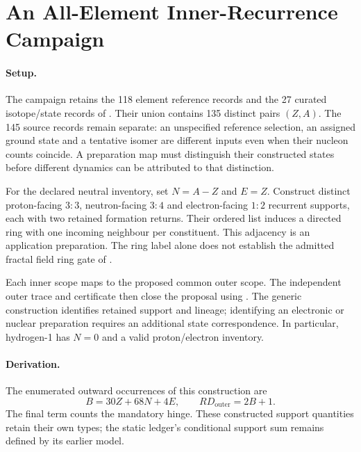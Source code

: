 \section{An All-Element Inner-Recurrence Campaign}
\label{manual2:all-element-campaign}


\paragraph{Setup.}
The campaign retains the 118 element reference records and the 27 curated
isotope/state records of . Their union contains
135 distinct pairs \((Z,A)\). The 145 source records remain separate: an
unspecified reference selection, an assigned ground state and a tentative isomer
are different inputs even when their nucleon counts coincide. A preparation map
must distinguish their constructed states before different dynamics can be
attributed to that distinction.

For the declared neutral inventory, set \(N=A-Z\) and \(E=Z\). Construct
distinct proton-facing \(3{:}3\), neutron-facing \(3{:}4\) and electron-facing
\(1{:}2\) recurrent supports, each with two retained formation returns.
Their ordered list induces a directed ring with one incoming neighbour per
constituent. This adjacency is an application preparation. The ring label alone
does not establish the admitted fractal field ring gate of
.

Each inner scope maps to the proposed common outer scope. The independent outer
trace and certificate then close the proposal using
. The generic construction identifies retained
support and lineage; identifying an electronic or nuclear preparation requires
an additional state correspondence. In particular, hydrogen-1 has \(N=0\)
and a valid proton/electron inventory.

\paragraph{Derivation.}
The enumerated outward occurrences of this construction are
\begin{equation}
B=30Z+68N+4E,
\qquad RD_{\mathrm{outer}}=2B+1.
\label{eq:manual2-campaign-support}
\end{equation}
The final term counts the mandatory hinge. These constructed support quantities
retain their own types; the static ledger's conditional support sum remains
defined by its earlier model.


